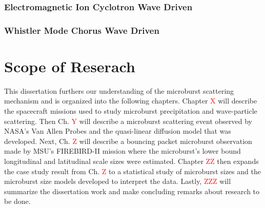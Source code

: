 \subsubsection{Electromagnetic Ion Cyclotron Wave Driven}\label{Intro:emic_scattering}

\subsubsection{Whistler Mode Chorus Wave Driven}\label{Intro:chorus_scattering}

\section{Scope of Reserach}\label{Intro:scope}
This dissertation furthers our understanding of the microburst scattering mechanism and is organized into the following chapters. Chapter \textcolor{red}{X} will describe the spacecraft missions used to study microburst precipitation and wave-particle scattering. Then Ch. \textcolor{red}{Y} will describe a microburst scattering event observed by NASA's Van Allen Probes and the quasi-linear diffusion model that was developed. Next, Ch. \textcolor{red}{Z} will describe a bouncing packet microburst observation made by MSU's FIREBIRD-II mission where the microburst's lower bound longitudinal and latitudinal scale sizes were estimated. Chapter \textcolor{red}{ZZ} then expands the case study result from Ch. \textcolor{red}{Z} to a statistical study of microburst sizes and the microburst size models developed to interpret the data. Lastly, \textcolor{red}{ZZZ} will summarize the dissertation work and make concluding remarks about research to be done.